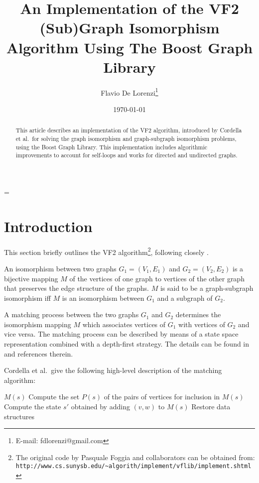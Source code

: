 \documentclass[12pt]{article}
\title{An Implementation of the {\sc VF2} (Sub)Graph Isomorphism Algorithm
Using The Boost Graph Library}
\author{Flavio De Lorenzi\thanks{E-mail: fdlorenzi@gmail.com}}
\date{\today}
\def\etal{{et al.\ }}
\begin{document}
\maketitle

\begin{abstract}
This article describes an implementation of the {\sc VF2} algorithm, introduced
by Cordella \etal for solving the graph isomorphism and graph-subgraph
isomorphism problems, using the Boost Graph Library.  This implementation
includes algorithmic improvements to account for self-loops and works for
directed and undirected graphs.
\end{abstract}

\baselineskip=\normalbaselineskip


\section{Introduction}
This section briefly outlines the {\sc VF2} algorithm\footnote{The original
code by Pasquale Foggia and collaborators can be obtained from:
\texttt{http://www.cs.sunysb.edu/{\textasciitilde}algorith/implement/vflib/implement.shtml}},
following closely \cite{cordella+2001, cordella+2004}.

An isomorphism between two graphs $G_1=(V_1, E_1)$ and $G_2=(V_2, E_2)$ is a
bijective mapping $M$ of the vertices of one graph to vertices of the other
graph that preserves the edge structure of the graphs. $M$ is said to be a
graph-subgraph isomorphism iff $M$ is an isomorphism between $G_1$ and a
subgraph of $G_2$.

A matching process between the two graphs $G_1$ and $G_2$ determines the
isomorphism mapping $M$ which associates vertices of $G_1$ with vertices of
$G_2$ and vice versa.  The matching process can be described by means of a
state space representation combined with a depth-first strategy. The details
can be found in \cite{cordella+2001, cordella+2004} and references therein.

Cordella \etal give the following high-level description of the matching
algorithm:

\begin{algorithmic}
    \State \Return $M(s)$
\Else
    \State Compute the set $P(s)$ of the pairs of vertices for inclusion in $M(s)$
            \State Compute the state $s'$ obtained by adding $(v,w)$ to $M(s)$
            \State {}
         \EndIf
    \EndFor
    \State Restore data structures
\EndIf
\EndProcedure
\end{algorithmic}
\end{document}
